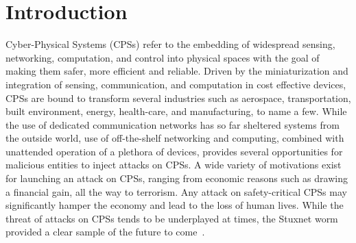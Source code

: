 \section{Introduction}
Cyber-Physical Systems (CPSs) refer to the embedding of widespread sensing, networking, computation, and control into physical spaces with the goal of making them safer, more efficient and reliable. Driven by the miniaturization and integration of sensing, communication, and computation in cost effective devices, CPSs are bound to transform several industries such as aerospace, transportation, built environment, energy, health-care, and manufacturing, to name a few. While the use of dedicated communication networks has so far sheltered systems from the outside world, use of off-the-shelf networking and computing, combined with unattended operation of a plethora of devices, provides several opportunities for malicious entities to inject attacks on CPSs. A wide variety of motivations exist for launching an attack on CPSs, ranging from economic reasons such as drawing a financial gain, all the way to terrorism. Any attack on safety-critical CPSs may significantly hamper the economy and lead to the loss of human lives. While the threat of attacks on CPSs tends to be underplayed at times, the Stuxnet worm provided a clear sample of the future to come~\cite{Chen_2010,Fidler_2011}.

